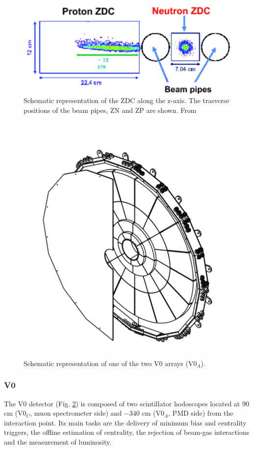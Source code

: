 \begin{figure}[!h]
\begin{center}
\includegraphics[width=.5\linewidth]{Chapters/Introduction/Figs/ZDC.pdf}
\caption{Schematic representation of the ZDC along the z-axis. The trasverse positions of the beam pipes, ZN and ZP are shown. From \cite{Oyama:2013xra}}
\label{fig:ZDC}
\end{center}
\end{figure}

\begin{figure}[!h]
\begin{center}
\includegraphics[width=.7\linewidth]{Chapters/Introduction/Figs/V0.pdf}
\caption{Schematic representation of one of the two V0 arrays (V0$_A$).}
\label{fig:V0}
\end{center}
\end{figure}

\subsubsection{V0}
The V0 detector (Fig. \ref{fig:V0}) is composed of two scintillator hodoscopes located at $90$ cm (V0$_C$, muon spectrometer side) and $-340$ cm (V0$_A$, PMD side) from the interaction point. 
Its main tasks are the delivery of minimum bias and centrality triggers, the offline estimation of centrality, the rejection of beam-gas interactions and the measurement of luminosity.

